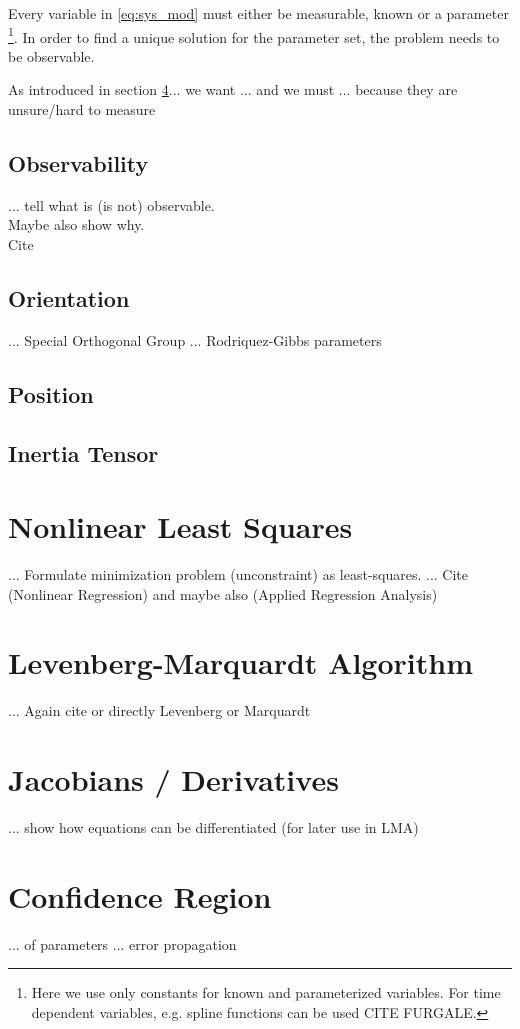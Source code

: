 Every variable in \eqref{eq:sys_mod} must either be measurable, known or a parameter
\footnote{Here we use only constants for known and parameterized variables. For time dependent variables, e.g. spline functions can be used CITE FURGALE.}.
In order to find a unique solution for the parameter set, the problem needs to be observable.


As introduced in section \ref{}... we want ... and we must ... because they are unsure/hard to measure
\subsection{Observability}
\label{sub:observability}
... tell what is (is not) observable. \\ Maybe also show why. \\ Cite \cite{hermann1977}

\subsection{Orientation}
\label{sub:par_orientation}
... Special Orthogonal Group
... Rodriquez-Gibbs parameters

\subsection{Position}
\label{sub:par_position}

\subsection{Inertia Tensor}
\label{sub:par_inertia}

\section{Nonlinear Least Squares}
... Formulate minimization problem (unconstraint) as least-squares.
... Cite \cite{Seber} (Nonlinear Regression) and maybe also \cite{Draper} (Applied Regression Analysis)

\section{Levenberg-Marquardt Algorithm}
... Again cite \cite{Seber} or directly Levenberg or Marquardt

\section{Jacobians / Derivatives}
... show how equations can be differentiated (for later use in LMA)

\section{Confidence Region}
... of parameters
... error propagation \cite{Siegwart}
